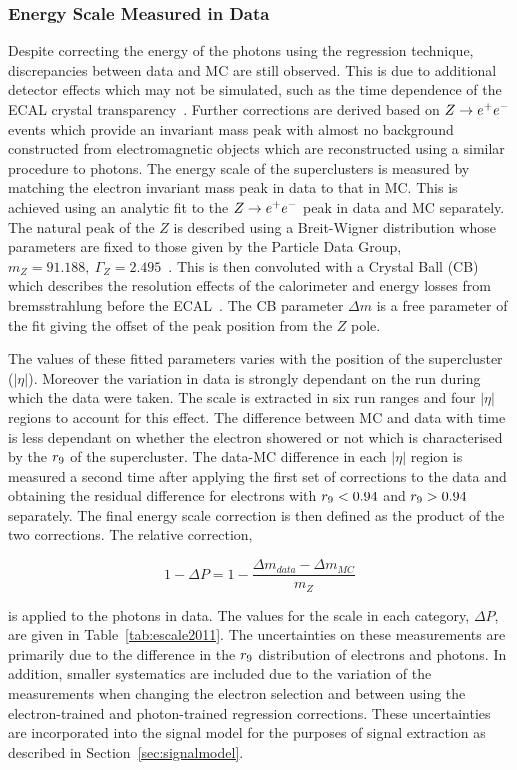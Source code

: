 \subsubsection{Energy Scale Measured in Data}
Despite correcting the energy of the photons using the regression technique, discrepancies between data and
MC are still observed. This is due to additional detector effects which may not be simulated, such as the
time dependence of the ECAL crystal transparency~\citep{null}. Further corrections are
derived based on $Z\rightarrow e^{+}e^{-}$ events which provide an invariant mass peak with almost no background constructed from 
electromagnetic objects which are reconstructed using a similar procedure to photons.
The energy scale of the superclusters is measured by matching the electron
invariant mass peak in data to that in MC. This is achieved using an analytic fit to the $Z\rightarrow e^{+}e^{-}$ peak in data and MC
separately. The natural peak of the $Z$ is described using a Breit-Wigner distribution whose parameters are fixed
to those given by the Particle Data Group, $m_{Z}=91.188,~\Gamma_{Z} = 2.495$~\citep{pdg}. This is then convoluted 
with a Crystal Ball (CB) which describes the resolution effects of the calorimeter and energy losses from 
bremsstrahlung before the ECAL~\citep{crystalball}. 
The CB parameter $\Delta m$ is a free parameter of the fit giving the 
offset of the peak position from the $Z$ pole. 

The values of these fitted parameters varies with the position of the supercluster ($|\eta|$). Moreover the
variation in data is strongly dependant on the run during which the data were taken. The scale is extracted in 
six run ranges and four $|\eta|$ regions to account for this effect. 
The difference between MC and data with time is less dependant on whether the electron showered or not which 
is characterised by the $r_{9}$ of the supercluster. The data-MC difference in each $|\eta|$ region is measured
a second time after applying the first set of corrections to the data and obtaining the residual difference
for electrons with $r_{9}<0.94$ and $r_{9}>0.94$ separately. The final energy scale correction is then defined
as the product of the two corrections. The relative correction, 

\begin{equation}
1-\Delta P = 1 - \frac {\displaystyle \Delta m_{data} - \Delta m_{MC} }{\displaystyle m_{Z} }
\end{equation}

is applied to the photons in data. The values for the scale in each category, $\Delta P$, are given in 
Table~\ref{tab:escale2011}. The uncertainties on these measurements are primarily due to 
the difference in the $r_{9}$ distribution of electrons and photons. In addition, smaller systematics
are included due to the variation of the measurements when changing the electron selection and
between using the electron-trained and photon-trained regression corrections.
These uncertainties are incorporated into the signal model for the purposes of 
signal extraction as described in Section~\ref{sec:signalmodel}.

